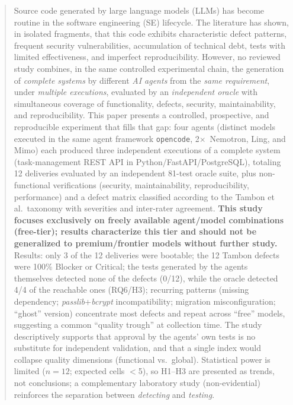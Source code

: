 \documentclass[11pt]{article}
\begin{document}
\begin{abstract}
Source code generated by large language models (LLMs) has become routine in the software engineering (SE) lifecycle. The literature has shown, in isolated fragments, that this code exhibits characteristic defect patterns, frequent security vulnerabilities, accumulation of technical debt, tests with limited effectiveness, and imperfect reproducibility. However, no reviewed study combines, in the same controlled experimental chain, the generation of \emph{complete systems} by different \emph{AI agents} from the \emph{same requirement}, under \emph{multiple executions}, evaluated by an \emph{independent oracle} with simultaneous coverage of functionality, defects, security, maintainability, and reproducibility. This paper presents a controlled, prospective, and reproducible experiment that fills that gap: four agents (distinct models executed in the same agent framework \texttt{opencode}, 2$\times$~Nemotron, Ling, and Mimo) each produced three independent executions of a complete system (task-management REST API in Python/FastAPI/PostgreSQL), totaling 12 deliveries evaluated by an independent 81-test oracle suite, plus non-functional verifications (security, maintainability, reproducibility, performance) and a defect matrix classified according to the Tambon et al.\ taxonomy with severities and inter-rater agreement. \textbf{This study focuses exclusively on freely available agent/model combinations (free-tier); results characterize this tier and should not be generalized to premium/frontier models without further study.} Results: only 3 of the 12 deliveries were bootable; the 12 Tambon defects were 100\% Blocker or Critical; the tests generated by the agents themselves detected none of the defects (0/12), while the oracle detected 4/4 of the reachable ones (RQ6/H3); recurring patterns (missing dependency; \textit{passlib}+\textit{bcrypt} incompatibility; migration misconfiguration; ``ghost'' version) concentrate most defects and repeat across ``free'' models, suggesting a common ``quality trough'' at collection time. The study descriptively supports that approval by the agents' own tests is no substitute for independent validation, and that a single index would collapse quality dimensions (functional vs.\ global). Statistical power is limited ($n=12$; expected cells $<$5), so H1--H3 are presented as trends, not conclusions; a complementary laboratory study (non-evidential) reinforces the separation between \emph{detecting} and \emph{testing}.
\end{abstract}
\end{document}
